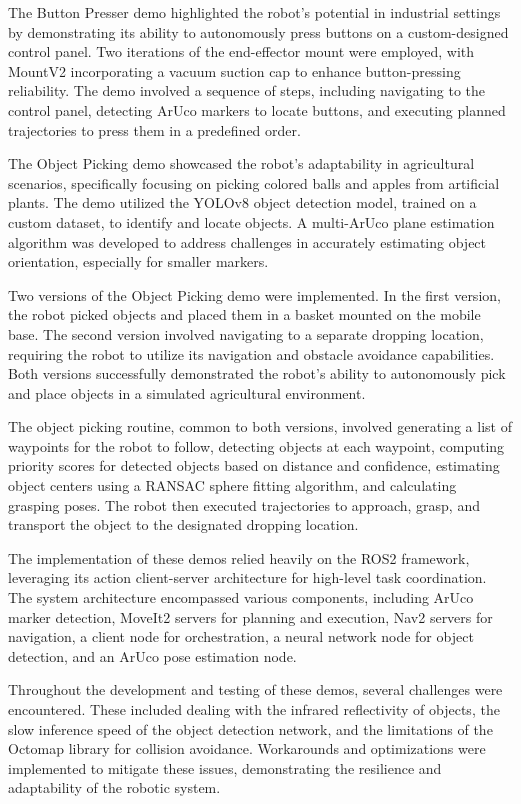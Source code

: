 The Button Presser demo highlighted the robot's potential in industrial settings by demonstrating its ability 
to autonomously press buttons on a custom-designed control panel. Two iterations of the end-effector mount were employed,
with MountV2 incorporating a vacuum suction cap to enhance button-pressing reliability.  The demo involved a 
sequence of steps, including navigating to the control panel, detecting ArUco markers to locate buttons, 
and executing planned trajectories to press them in a predefined order.

The Object Picking demo showcased the robot's adaptability in agricultural scenarios, specifically focusing 
on picking colored balls and apples from artificial plants.  The demo utilized the YOLOv8 object detection model,
trained on a custom dataset, to identify and locate objects. A multi-ArUco plane estimation algorithm was 
developed to address challenges in accurately estimating object orientation, especially for smaller markers.

Two versions of the Object Picking demo were implemented. In the first version, the robot picked objects and 
placed them in a basket mounted on the mobile base.  The second version involved navigating to a separate dropping 
location, requiring the robot to utilize its navigation and obstacle avoidance capabilities. Both versions 
successfully demonstrated the robot's ability to autonomously pick and place objects in a simulated agricultural 
environment.

The object picking routine, common to both versions, involved generating a list of waypoints for the robot to follow,
detecting objects at each waypoint, computing priority scores for detected objects based on distance and confidence, 
estimating object centers using a RANSAC sphere fitting algorithm, and calculating grasping poses. The robot then 
executed trajectories to approach, grasp, and transport the object to the designated dropping location.

The implementation of these demos relied heavily on the ROS2 framework, leveraging its action client-server 
architecture for high-level task coordination. The system architecture encompassed various components, including 
ArUco marker detection, MoveIt2 servers for planning and execution, Nav2 servers for navigation, a client 
node for orchestration, a neural network node for object detection, and an ArUco pose estimation node.

Throughout the development and testing of these demos, several challenges were encountered. These included 
dealing with the infrared reflectivity of objects, the slow inference speed of the object detection network, 
and the limitations of the Octomap library for collision avoidance.  Workarounds and optimizations were 
implemented to mitigate these issues, demonstrating the resilience and adaptability of the robotic system.


